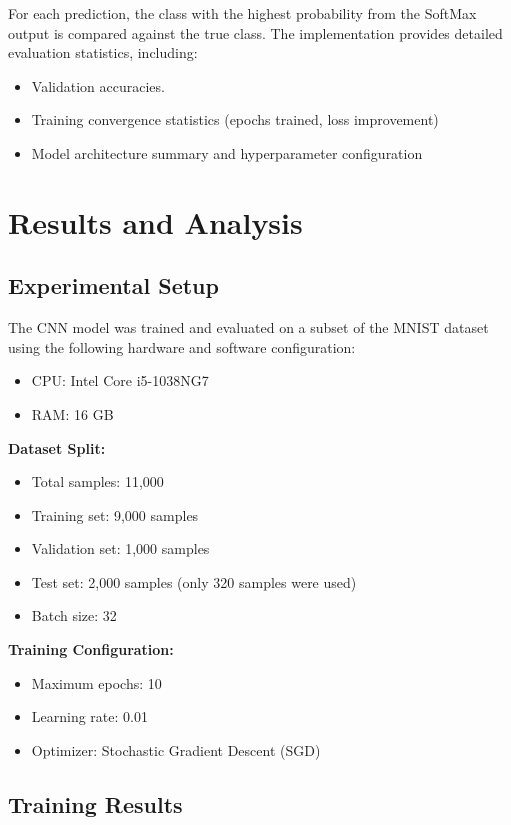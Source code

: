 \documentclass[conference]{IEEEtran}
\begin{document}
For each prediction, the class with the highest probability from the SoftMax output is compared against the true class. The implementation provides detailed evaluation statistics, including:
\begin{itemize}
\item Validation accuracies.
\item Training convergence statistics (epochs trained, loss improvement)
\item Model architecture summary and hyperparameter configuration
\end{itemize}

\section{Results and Analysis}
\subsection{Experimental Setup}
The CNN model was trained and evaluated on a subset of the MNIST dataset using the following hardware and software configuration:
\begin{itemize}
    \item CPU: Intel Core i5-1038NG7
    \item RAM: 16 GB
\end{itemize}

\textbf{Dataset Split:}
\begin{itemize}
\item Total samples: 11,000
\item Training set: 9,000 samples
\item Validation set: 1,000 samples
\item Test set: 2,000 samples (only 320 samples were used)
\item Batch size: 32
\end{itemize}

\textbf{Training Configuration:}
\begin{itemize}
\item Maximum epochs: 10
\item Learning rate: 0.01
\item Optimizer: Stochastic Gradient Descent (SGD)
\end{itemize}

\subsection{Training Results}
\end{document}
